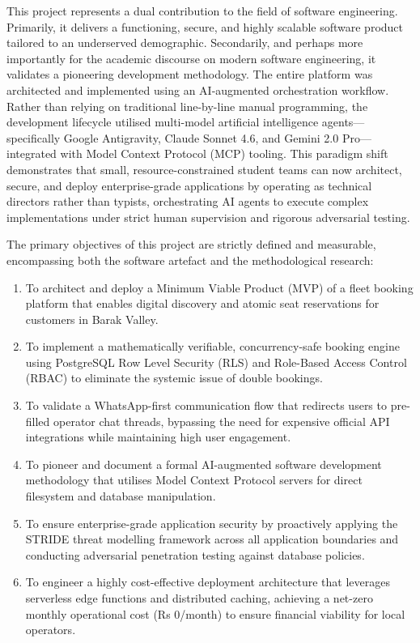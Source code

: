 \documentclass[12pt,a4paper]{report}
\begin{document}
This project represents a dual contribution to the field of software engineering. Primarily, it delivers a functioning, secure, and highly scalable software product tailored to an underserved demographic. Secondarily, and perhaps more importantly for the academic discourse on modern software engineering, it validates a pioneering development methodology. The entire platform was architected and implemented using an AI-augmented orchestration workflow. Rather than relying on traditional line-by-line manual programming, the development lifecycle utilised multi-model artificial intelligence agents---specifically Google Antigravity, Claude Sonnet 4.6, and Gemini 2.0 Pro---integrated with Model Context Protocol (MCP) tooling. This paradigm shift demonstrates that small, resource-constrained student teams can now architect, secure, and deploy enterprise-grade applications by operating as technical directors rather than typists, orchestrating AI agents to execute complex implementations under strict human supervision and rigorous adversarial testing.

The primary objectives of this project are strictly defined and measurable, encompassing both the software artefact and the methodological research:
\begin{enumerate}
    \item To architect and deploy a Minimum Viable Product (MVP) of a fleet booking platform that enables digital discovery and atomic seat reservations for customers in Barak Valley.
    \item To implement a mathematically verifiable, concurrency-safe booking engine using PostgreSQL Row Level Security (RLS) and Role-Based Access Control (RBAC) to eliminate the systemic issue of double bookings.
    \item To validate a WhatsApp-first communication flow that redirects users to pre-filled operator chat threads, bypassing the need for expensive official API integrations while maintaining high user engagement.
    \item To pioneer and document a formal AI-augmented software development methodology that utilises Model Context Protocol servers for direct filesystem and database manipulation.
    \item To ensure enterprise-grade application security by proactively applying the STRIDE threat modelling framework across all application boundaries and conducting adversarial penetration testing against database policies.
    \item To engineer a highly cost-effective deployment architecture that leverages serverless edge functions and distributed caching, achieving a net-zero monthly operational cost (Rs 0/month) to ensure financial viability for local operators.
\end{enumerate}
\end{document}
